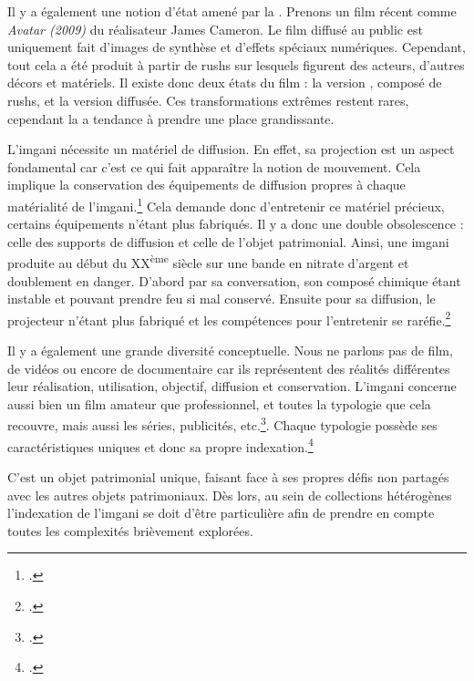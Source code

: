 Il y a également une notion d'état amené par la . Prenons un film récent comme \textit{Avatar (2009)} du réalisateur James Cameron. Le film diffusé au public est uniquement fait d'images de synthèse et d'effets spéciaux numériques. Cependant, tout cela a été produit à partir de \glspl{rush} sur lesquels figurent des acteurs, d'autres décors et matériels. Il existe donc deux états du film : la version , composé de \glspl{rush}, et la version diffusée. Ces transformations extrêmes restent rares, cependant la  a tendance à prendre une place grandissante.\newline

L'\gls{imgani} nécessite un matériel de diffusion. En effet, sa projection est un aspect fondamental car c'est ce qui fait apparaître la notion de mouvement. Cela implique la conservation des équipements de diffusion propres à chaque matérialité de l'\gls{imgani}.\footcite{edmondsonPHILOSOPHYPRINCIPLES} Cela demande donc d'entretenir ce matériel précieux, certains équipements n'étant plus fabriqués. Il y a donc une double obsolescence : celle des supports de diffusion et celle de l'objet patrimonial. Ainsi, une \gls{imgani} produite au début du XX\textsuperscript{ème} siècle sur une bande en nitrate d'argent et doublement en danger. D'abord par sa conversation, son composé chimique étant instable et pouvant prendre feu si mal conservé. Ensuite pour sa diffusion, le projecteur n'étant plus fabriqué et les compétences pour l'entretenir se raréfie.\footcite[p.39 et 54]{edmondsonPHILOSOPHYPRINCIPLES}

Il y a également une grande diversité conceptuelle. Nous ne parlons pas de film, de vidéos ou encore de documentaire car ils représentent des réalités différentes leur réalisation, utilisation, objectif, diffusion et conservation. L'\gls{imgani} concerne aussi bien un film amateur que professionnel, et toutes la typologie que cela recouvre, mais aussi les séries, publicités, etc.\footcite[p.5]{fairbairnManuelCatalogageImages}. Chaque typologie possède ses caractéristiques uniques et donc sa propre indexation.\footcite[p.18 et 34]{edmondsonPHILOSOPHYPRINCIPLES}\newline

C'est un objet patrimonial unique, faisant face à ses propres défis non partagés avec les autres objets patrimoniaux. Dès lors, au sein de collections hétérogènes l'indexation de l'\gls{imgani} se doit d'être particulière afin de prendre en compte toutes les complexités brièvement explorées.

